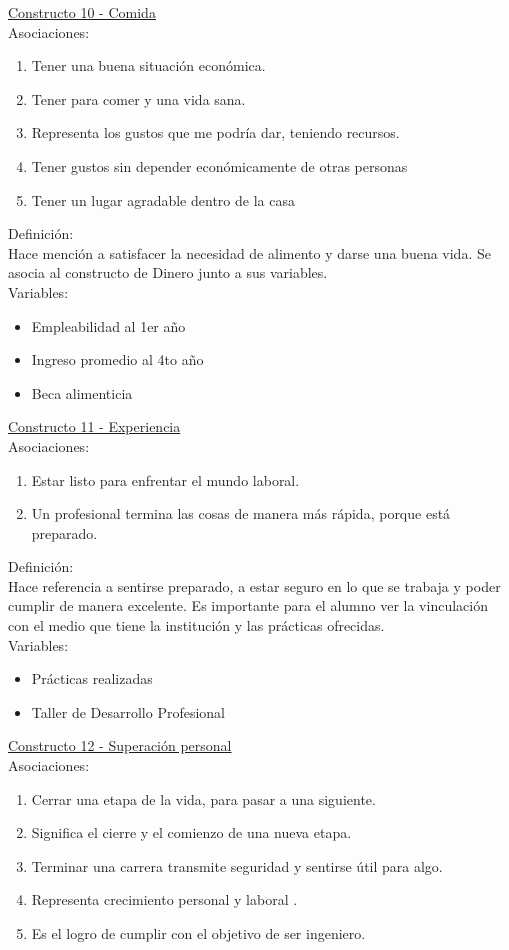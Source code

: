 \underline {Constructo 10 - Comida} \\
Asociaciones:
\begin{enumerate}
	\item Tener una buena situación económica.
	\item Tener para comer y una vida sana.
	\item Representa los gustos que me podría dar, teniendo recursos.	
	\item Tener gustos sin depender económicamente de otras personas
	\item Tener un lugar agradable dentro de la casa
\end{enumerate}

Definición:\\

Hace mención a satisfacer la necesidad de alimento y darse una buena vida. Se asocia al constructo de Dinero junto a sus variables.\\

Variables:
\begin{itemize}
	\item Empleabilidad al 1er año
	\item Ingreso promedio al 4to año
	\item Beca alimenticia
\end{itemize} 

\underline {Constructo 11 - Experiencia} \\
Asociaciones:
\begin{enumerate}
	\item Estar listo para enfrentar el mundo laboral.
	\item Un profesional termina las cosas de manera más rápida, porque está preparado.	
\end{enumerate}

Definición:\\

Hace referencia a sentirse preparado, a estar seguro en lo que se trabaja y poder cumplir de manera excelente. Es importante para el alumno ver la vinculación con el medio que tiene la institución y las prácticas ofrecidas.\\

Variables:
\begin{itemize}
	\item Prácticas realizadas
	\item Taller de Desarrollo Profesional	
\end{itemize}


\underline {Constructo 12 - Superación personal} \\
Asociaciones:
\begin{enumerate}
	\item Cerrar una etapa de la vida, para pasar a una siguiente.
	\item Significa el cierre y el comienzo de una nueva etapa.
	\item Terminar una carrera transmite seguridad y sentirse útil para algo.
	\item Representa crecimiento personal y laboral	.
	\item Es el logro de cumplir con el objetivo de ser ingeniero.
\end{enumerate}

